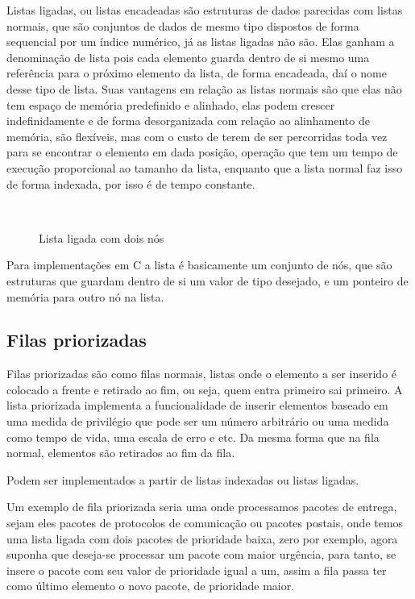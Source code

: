 Listas ligadas, ou listas encadeadas são estruturas de dados parecidas com listas normais, que são conjuntos de dados de mesmo tipo dispostos de forma sequencial por um índice numérico, já as listas ligadas não são. Elas ganham a denominação de lista pois cada elemento guarda dentro de si mesmo uma referência para o próximo elemento da lista, de forma encadeada, daí o nome desse tipo de lista. Suas vantagens em relação as listas normais são que elas não tem espaço de memória predefinido e alinhado, elas podem crescer indefinidamente e de forma desorganizada com relação ao alinhamento de memória, são flexíveis, mas com o custo de terem de ser percorridas toda vez para se encontrar o elemento em dada posição, operação que tem um tempo de execução proporcional ao tamanho da lista, enquanto que a lista normal faz isso de forma indexada, por isso é de tempo constante.

\begin{figure}[ht]
	\centering
	\caption{Lista ligada com dois nós}
	\\
	\label{fig:linked}
\end{figure}

Para implementações em C a lista é basicamente um conjunto de nós, que são estruturas que guardam dentro de si um valor de tipo desejado, e um ponteiro de memória para outro nó na lista.

\subsection{Filas priorizadas}

Filas priorizadas são como filas normais, listas onde o elemento a ser inserido é colocado a frente e retirado ao fim, ou seja, quem entra primeiro sai primeiro. A lista priorizada implementa a funcionalidade de inserir elementos baseado em uma medida de privilégio que pode ser um número arbitrário ou uma medida como tempo de vida, uma escala de erro e etc. Da mesma forma que na fila normal, elementos são retirados ao fim da fila.

Podem ser implementados a partir de listas indexadas ou listas ligadas.

Um exemplo de fila priorizada seria uma onde processamos pacotes de entrega, sejam eles pacotes de protocolos de comunicação ou pacotes postais, onde temos uma lista ligada com dois pacotes de prioridade baixa, zero por exemplo, agora suponha que deseja-se processar um pacote com maior urgência, para tanto, se insere o pacote com seu valor de prioridade igual a um, assim a fila passa ter como último elemento o novo pacote, de prioridade maior.

